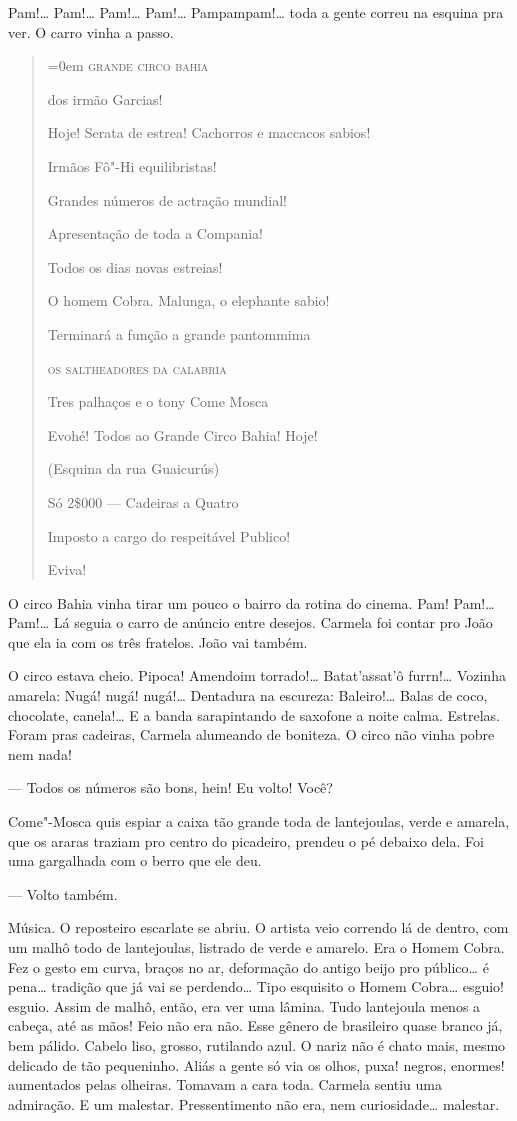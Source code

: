 Pam!\ldots{} Pam!\ldots{} Pam!\ldots{} Pam!\ldots{} Pampampam!\ldots{} toda a gente correu na
esquina pra ver. O carro vinha a passo.

\begin{quote}\parindent=0em
\textsc{grande circo bahia}

dos irmão Garcias!

Hoje! Serata de estrea! Cachorros e maccacos sabios!

Irmãos Fô"-Hi equilibristas!

Grandes números de actração mundial!

Apresentação de toda a Compania!

Todos os dias novas estreias!

O homem Cobra. Malunga, o elephante sabio!

Terminará a função a grande pantommima

\textsc{os saltheadores da calabria}

Tres palhaços e o tony Come Mosca

Evohé! Todos ao Grande Circo Bahia! Hoje!

(Esquina da rua Guaicurús)

Só 2\$000 --- Cadeiras a Quatro

Imposto a cargo do respeitável Publico!

Eviva!
\end{quote}

O circo Bahia vinha tirar um pouco o bairro da rotina do cinema. Pam!
Pam!\ldots{} Pam!\ldots{} Lá seguia o carro de anúncio entre desejos. Carmela foi
contar pro João que ela ia com os três fratelos. João vai também.

O circo estava cheio. Pipoca! Amendoim torrado!\ldots{} Batat'assat'ô
furrn!\ldots{} Vozinha amarela: Nugá! nugá! nugá!\ldots{} Dentadura na escureza:
Baleiro!\ldots{} Balas de coco, chocolate, canela!\ldots{} E a banda sarapintando
de saxofone a noite calma. Estrelas. Foram pras cadeiras, Carmela
alumeando de boniteza. O circo não vinha pobre nem nada!

--- Todos os números são bons, hein! Eu volto! Você?

Come"-Mosca quis espiar a caixa tão grande toda de lantejoulas, verde e
amarela, que os araras traziam pro centro do picadeiro, prendeu o pé
debaixo dela. Foi uma gargalhada com o berro que ele deu.

--- Volto também.

Música. O reposteiro escarlate se abriu. O artista veio correndo lá de
dentro, com um malhô todo de lantejoulas, listrado de verde e amarelo.
Era o Homem Cobra. Fez o gesto em curva, braços no ar, deformação do
antigo beijo pro público\ldots{} é pena\ldots{} tradição que já vai se perdendo\ldots{}
Tipo esquisito o Homem Cobra\ldots{} esguio! esguio. Assim de malhô, então,
era ver uma lâmina. Tudo lantejoula menos a cabeça, até as mãos! Feio
não era não. Esse gênero de brasileiro quase branco já, bem pálido.
Cabelo liso, grosso, rutilando azul. O nariz não é chato mais, mesmo
delicado de tão pequeninho. Aliás a gente só via os olhos, puxa! negros,
enormes! aumentados pelas olheiras. Tomavam a cara toda. Carmela sentiu
uma admiração. E um malestar. Pressentimento não era, nem curiosidade\ldots{}
malestar.

